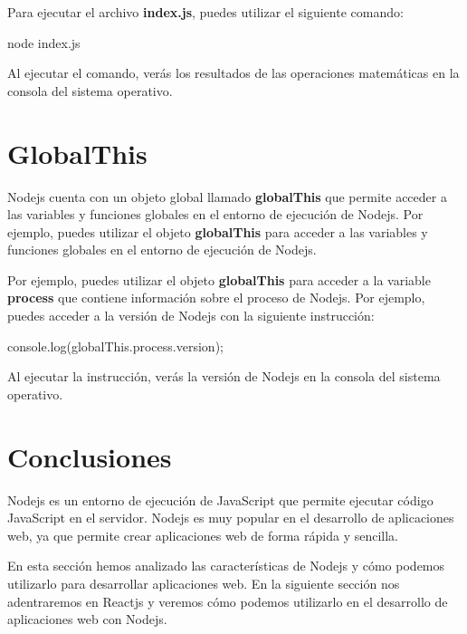 \documentclass[
  a4paper,
  DIV=11,
  numbers=noendperiod,
  onepage,
  openany]{scrreprt}
\newenvironment{Shaded}{\begin{snugshade}}{\end{snugshade}}
\newcommand{\AttributeTok}[1]{\textcolor[rgb]{0.40,0.45,0.13}{#1}}
\newcommand{\BuiltInTok}[1]{\textcolor[rgb]{0.00,0.23,0.31}{#1}}
\newcommand{\ExtensionTok}[1]{\textcolor[rgb]{0.00,0.23,0.31}{#1}}
\newcommand{\FunctionTok}[1]{\textcolor[rgb]{0.28,0.35,0.67}{#1}}
\newcommand{\NormalTok}[1]{\textcolor[rgb]{0.00,0.23,0.31}{#1}}
\newcommand{\OperatorTok}[1]{\textcolor[rgb]{0.37,0.37,0.37}{#1}}
\begin{document}
Para ejecutar el archivo \textbf{index.js}, puedes utilizar el siguiente
comando:

\begin{Shaded}
\begin{Highlighting}[]
\ExtensionTok{node}\NormalTok{ index.js}
\end{Highlighting}
\end{Shaded}

Al ejecutar el comando, verás los resultados de las operaciones
matemáticas en la consola del sistema operativo.

\section{GlobalThis}\label{globalthis}

Nodejs cuenta con un objeto global llamado \textbf{globalThis} que
permite acceder a las variables y funciones globales en el entorno de
ejecución de Nodejs. Por ejemplo, puedes utilizar el objeto
\textbf{globalThis} para acceder a las variables y funciones globales en
el entorno de ejecución de Nodejs.

Por ejemplo, puedes utilizar el objeto \textbf{globalThis} para acceder
a la variable \textbf{process} que contiene información sobre el proceso
de Nodejs. Por ejemplo, puedes acceder a la versión de Nodejs con la
siguiente instrucción:

\begin{Shaded}
\begin{Highlighting}[]
\BuiltInTok{console}\OperatorTok{.}\FunctionTok{log}\NormalTok{(globalThis}\OperatorTok{.}\AttributeTok{process}\OperatorTok{.}\AttributeTok{version}\NormalTok{)}\OperatorTok{;}
\end{Highlighting}
\end{Shaded}

Al ejecutar la instrucción, verás la versión de Nodejs en la consola del
sistema operativo.

\section{Conclusiones}\label{conclusiones-1}

Nodejs es un entorno de ejecución de JavaScript que permite ejecutar
código JavaScript en el servidor. Nodejs es muy popular en el desarrollo
de aplicaciones web, ya que permite crear aplicaciones web de forma
rápida y sencilla.

En esta sección hemos analizado las características de Nodejs y cómo
podemos utilizarlo para desarrollar aplicaciones web. En la siguiente
sección nos adentraremos en Reactjs y veremos cómo podemos utilizarlo en
el desarrollo de aplicaciones web con Nodejs.
\end{document}

